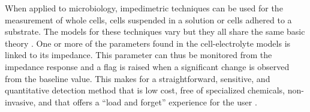 When applied to microbiology, impedimetric techniques can be used for the measurement of whole cells, cells suspended in a solution or cells adhered to a substrate. The models for these techniques vary but they all share the same basic theory \cite{Xu2016}. One or more of the parameters found in the cell-electrolyte models is linked to its impedance. This parameter can thus be monitored from the impedance response and a flag is raised when a significant change is observed from the baseline value. This makes for a straightforward, sensitive, and quantitative detection method that is low cost, free of specialized chemicals, non-invasive, and that offers a “load and forget” experience for the user \cite{Grossi2017,Kargupta2018}.
